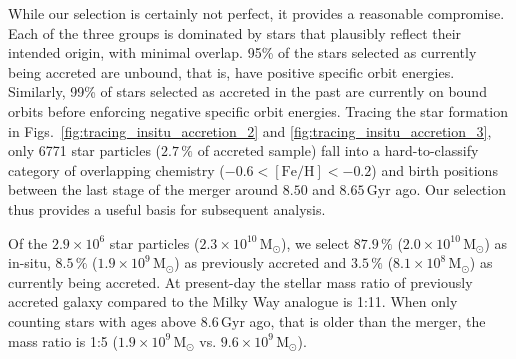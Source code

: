 \documentclass[fleqn,usenatbib]{mnras}
\begin{document}
While our selection is certainly not perfect, it provides a reasonable compromise. Each of the three groups is dominated by stars that plausibly reflect their intended origin, with minimal overlap. 95\% of the stars selected as currently being accreted are unbound, that is, have positive specific orbit energies. Similarly, 99\% of stars selected as accreted in the past are currently on bound orbits before enforcing negative specific orbit energies. Tracing the star formation in Figs.~\ref{fig:tracing_insitu_accretion_2} and \ref{fig:tracing_insitu_accretion_3}, only 6771 star particles ($2.7\,\%$ of accreted sample) fall into a hard-to-classify category of overlapping chemistry ($-0.6 < \mathrm{[Fe/H]} < -0.2$) and birth positions between the last stage of the merger around $8.50$ and $8.65\,\mathrm{Gyr}$ ago. Our selection thus provides a useful basis for subsequent analysis.

Of the $2.9 \times 10^6$ star particles ($2.3 \times 10^{10}\,\mathrm{M_\odot}$), we select $87.9\,\mathrm{\%}$ ($2.0 \times 10^{10}\,\mathrm{M_\odot}$) as in-situ, $8.5\,\mathrm{\%}$ ($1.9 \times 10^{9}\,\mathrm{M_\odot}$) as previously accreted and $3.5\,\mathrm{\%}$ ($8.1 \times 10^{8}\,\mathrm{M_\odot}$) as currently being accreted. At present-day the stellar mass ratio of previously accreted galaxy compared to the Milky Way analogue is 1:11. When only counting stars with ages above $8.6\,\mathrm{Gyr}$ ago, that is older than the merger, the mass ratio is 1:5 ($1.9 \times 10^{9}\,\mathrm{M_\odot}$ vs. $9.6 \times 10^{9}\,\mathrm{M_\odot}$).
\end{document}
